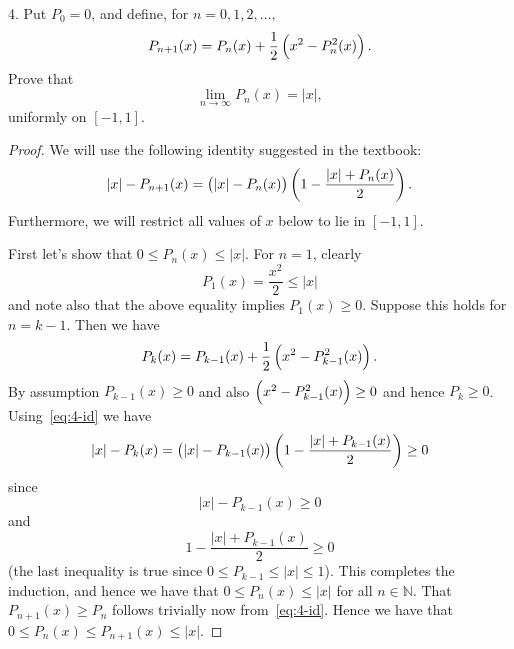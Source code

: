 \documentclass{article}
\newcommand{\N}{\mathbb{N}}
\begin{document}
\newpage

4. Put $P_0 = 0$, and define, for $n = 0, 1, 2, \ldots,$
%
\begin{equation*}
    P_{n + 1}(x) = P_n(x) + \frac{1}{2} \del{x^2 - P_n^2(x)}
    .
\end{equation*}
%
Prove that
%
\begin{equation*}
    \lim_{n \to \infty} P_n(x) = |x|
    ,
\end{equation*}
%
uniformly on $[-1, 1]$.

\begin{proof}

We will use the following identity suggested in the textbook:
%
\begin{equation}
    |x| - P_{n + 1}(x) = \del{|x| - P_n(x)} \del{1 - \frac{|x| + P_n(x)}{2}}
    \label{eq:4-id}
    .
\end{equation}
%
Furthermore, we will restrict all values of $x$ below to lie in $[-1, 1]$.

First let's show that $0 \leq P_n(x) \leq |x|$. For $n = 1$, clearly
%
\begin{equation*}
    P_1(x) = \frac{x^2}{2} \leq |x|
\end{equation*}
%
and note also that the above equality implies $P_1(x) \geq 0$. Suppose
this holds for $n = k - 1$. Then we have
%
\begin{equation*}
    P_k(x) = P_{k - 1}(x) + \frac{1}{2} \del{x^2 - P^2_{k - 1}(x)}
    .
\end{equation*}
%
By assumption $P_{k - 1}(x) \geq 0$ and also $\del{x^2 - P^2_{k - 1}(x)}
\geq 0$ and hence $P_k \geq 0$. Using~\eqref{eq:4-id} we have
%
\begin{equation*}
    |x| - P_{k}(x) = \del{|x| - P_{k - 1}(x)} \del{1 - \frac{|x| + P_{k - 1}(x)}{2}} \geq 0
\end{equation*}
%
since
%
\begin{equation*}
    |x| - P_{k - 1}(x) \geq 0
\end{equation*}
%
and
%
\begin{equation*}
    1 - \frac{|x| + P_{k - 1}(x)}{2} \geq 0
\end{equation*}
%
(the last inequality is true since $0 \leq P_{k - 1} \leq |x| \leq 1$).
This completes the induction, and hence we have that $0 \leq P_n(x) \leq
|x|$ for all $n \in \N$. That $P_{n + 1}(x) \geq P_n$ follows trivially
now from~\eqref{eq:4-id}. Hence we have that $0 \leq P_n(x) \leq P_{n +
1}(x) \leq |x|$.


\end{proof}
\end{document}
